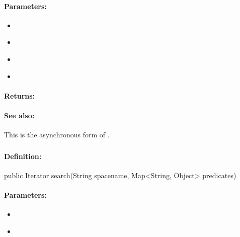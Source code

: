 \paragraph{Parameters:}
\begin{itemize}[noitemsep]
\item {}\\

\item {}\\

\item {}\\

\item {}\\

\end{itemize}

\paragraph{Returns:}


\paragraph{See also:}  This is the asynchronous form of .

\pagebreak
\subsubsection{}
\label{api:java:search}


\paragraph{Definition:}
\begin{javacode}
public Iterator search(String spacename, Map<String, Object> predicates)
\end{javacode}

\paragraph{Parameters:}
\begin{itemize}[noitemsep]
\item {}\\

\item {}\\

\end{itemize}

